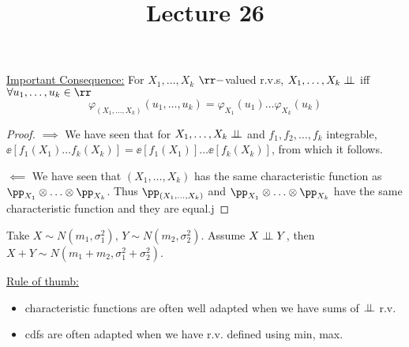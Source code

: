 \documentclass[../main.tex]{subfiles}
\title{Lecture 26}
\begin{document}
\underline{Important Consequence:} For $X_1, \ldots, X_k$ $\rr-$valued r.v.s, 
$X_1,\ldots, X_k \perp\!\!\!\!\,\perp $ iff $\forall u_1,\ldots, u_k \in \rr$
$$\varphi_{(X_1,\ldots, X_k)}(u_1,\ldots, u_k) = \varphi_{X_1}(u_1) \ldots
\varphi_{X_k}(u_k)$$
\begin{proof}
  $\boxed{\implies}$ We have seen that for $X_1,\ldots,X_k \perp\!\!\!\!\,\perp$ and $f_1,
  f_2,\ldots, f_k$ integrable, $\ee[f_1(X_1)\ldots f_k(X_k)] = \ee[f_1(X_1)]
  \ldots \ee[f_k(X_k)]$, from which it follows.

  $\boxed{\impliedby}$ We have seen that $(X_1,\ldots, X_k)$ has the same
  characteristic function as $\pp_{X_1} \otimes \ldots \otimes \pp_{X_k}$. Thus
  $\pp_{(X_1, \ldots, X_k)}$ and $\pp_{X_1} \otimes \ldots \otimes \pp_{X_k}$
  have the same characteristic function and they are equal.j
\end{proof}

\begin{application}
  Take $X \sim N(m_1, \sigma_1^2)$, $Y \sim N(m_2, \sigma_2^2)$. Assume $X\perp\!\!\!\!\,\perp
  Y$, then $X + Y \sim N(m_1 + m_2, \sigma_1^2 + \sigma_2^2)$.
\end{application}

\underline{Rule of thumb:}
\begin{itemize}
  \item characteristic functions are often well adapted when we have sums of
    $\perp\!\!\!\!\,\perp$ r.v.
  \item cdfs are often adapted when we have r.v. defined using min, max.
\end{itemize}
\end{document}
